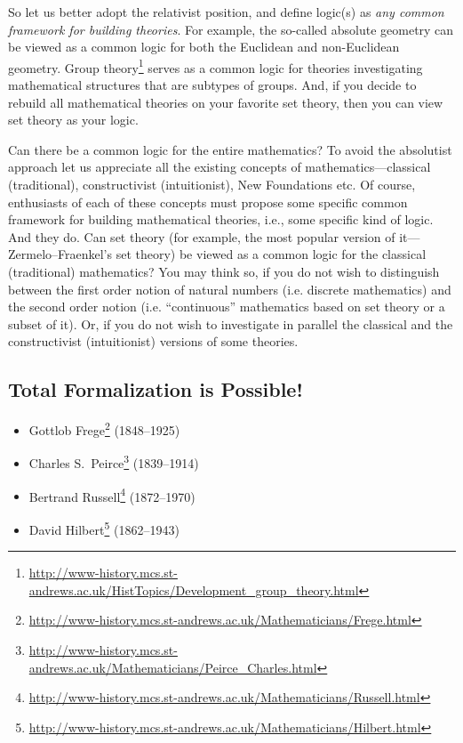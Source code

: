 So let us better adopt the relativist position, and define logic(s) as \emph{any common framework for building theories}.
For example, the so-called absolute geometry can be viewed as a common logic for both the Euclidean and non-Euclidean geometry.
Group theory\footnote{\url{http://www-history.mcs.st-andrews.ac.uk/HistTopics/Development\_group\_theory.html}} serves as a common logic for theories investigating mathematical structures that are subtypes of groups.
And, if you decide to rebuild all mathematical theories on your favorite set theory, then you can view set theory as your logic.

Can there be a common logic for the entire mathematics?
To avoid the absolutist approach let us appreciate all the existing concepts of mathematics---classical (traditional), constructivist (intuitionist), New Foundations etc.
Of course, enthusiasts of
each of these concepts must propose some specific common framework for building mathematical theories, i.e., some specific kind of logic.
And they do.
Can set theory (for example, the most popular version of it---Zermelo--Fraenkel's set theory) be viewed as a common logic for the classical (traditional) mathematics?
You may think so, if you do not wish to distinguish between the first order notion of natural numbers (i.e. discrete mathematics) and the second order notion (i.e. ``continuous'' mathematics based on set theory or a subset of it).
Or, if you do not wish to investigate in parallel the classical and the constructivist (intuitionist) versions of some theories.

\subsection{Total Formalization is Possible!}
\begin{itemize}
    \item Gottlob Frege\footnote{\url{http://www-history.mcs.st-andrews.ac.uk/Mathematicians/Frege.html}} (1848--1925)
    \item Charles S.\ Peirce\footnote{\url{http://www-history.mcs.st-andrews.ac.uk/Mathematicians/Peirce\_Charles.html}} (1839--1914)
    \item Bertrand Russell\footnote{\url{http://www-history.mcs.st-andrews.ac.uk/Mathematicians/Russell.html}} (1872--1970)
    \item David Hilbert\footnote{\url{http://www-history.mcs.st-andrews.ac.uk/Mathematicians/Hilbert.html}} (1862--1943)
\end{itemize}

